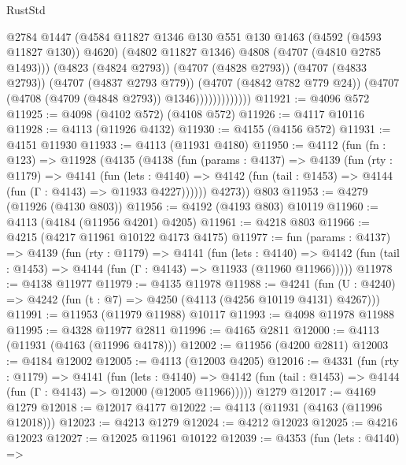 \begin{lexlean}{RustStd}
\begin{coremodule}
                            @2784
                            @1447
                            (@4584
                              @11827
                              @1346
                              @130
                              @551
                              @130
                              @1463
                              (@4592 (@4593 @11827 @130))
                              @4620)
                            (@4802 @11827 @1346)
                            @4808
                            (@4707 (@4810 @2785 @1493)))
                          (@4823 (@4824 @2793))
                          (@4707 (@4828 @2793))
                          (@4707 (@4833 @2793))
                          (@4707 (@4837 @2793 @779))
                          (@4707 (@4842 @782 @779 @24))
                          (@4707 (@4708 (@4709 (@4848 @2793)) @1346)))))))))))))
@11921 := @4096 @572
@11925 := @4098 (@4102 @572) (@4108 @572)
@11926 := @4117 @10116
@11928 := @4113 (@11926 @4132)
@11930 := @4155 (@4156 @572)
@11931 := @4151 @11930
@11933 := @4113 (@11931 @4180)
@11950 := @4112
    (fun (fn : @123) =>
    @11928
      (@4135
        (@4138
          (fun (params : @4137) =>
          @4139
            (fun (rty : @1179) =>
            @4141
              (fun (lets : @4140) =>
              @4142 (fun (tail : @1453) => @4144 (fun (Γ : @4143) => @11933 @4227))))))
        @4273))
    @803
@11953 := @4279 (@11926 (@4130 @803))
@11956 := @4192 (@4193 @803) @10119
@11960 := @4113 (@4184 (@11956 @4201) @4205)
@11961 := @4218 @803
@11966 := @4215 (@4217 @11961 @10122 @4173 @4175)
@11977 := fun (params : @4137) =>
  @4139
    (fun (rty : @1179) =>
    @4141
      (fun (lets : @4140) =>
      @4142 (fun (tail : @1453) => @4144 (fun (Γ : @4143) => @11933 (@11960 @11966)))))
@11978 := @4138 @11977
@11979 := @4135 @11978
@11988 := @4241
    (fun (U : @4240) => @4242 (fun (t : @7) => @4250 (@4113 (@4256 @10119 @4131) @4267)))
@11991 := @11953 (@11979 @11988) @10117
@11993 := @4098 @11978 @11988
@11995 := @4328 @11977 @2811
@11996 := @4165 @2811
@12000 := @4113 (@11931 (@4163 (@11996 @4178)))
@12002 := @11956 (@4200 @2811)
@12003 := @4184 @12002
@12005 := @4113 (@12003 @4205)
@12016 := @4331
    (fun (rty : @1179) =>
    @4141
      (fun (lets : @4140) =>
      @4142 (fun (tail : @1453) => @4144 (fun (Γ : @4143) => @12000 (@12005 @11966)))))
    @1279
@12017 := @4169 @1279
@12018 := @12017 @4177
@12022 := @4113 (@11931 (@4163 (@11996 @12018)))
@12023 := @4213 @1279
@12024 := @4212 @12023
@12025 := @4216 @12023
@12027 := @12025 @11961 @10122
@12039 := @4353
    (fun (lets : @4140) =>

\end{coremodule}
\end{lexlean}
